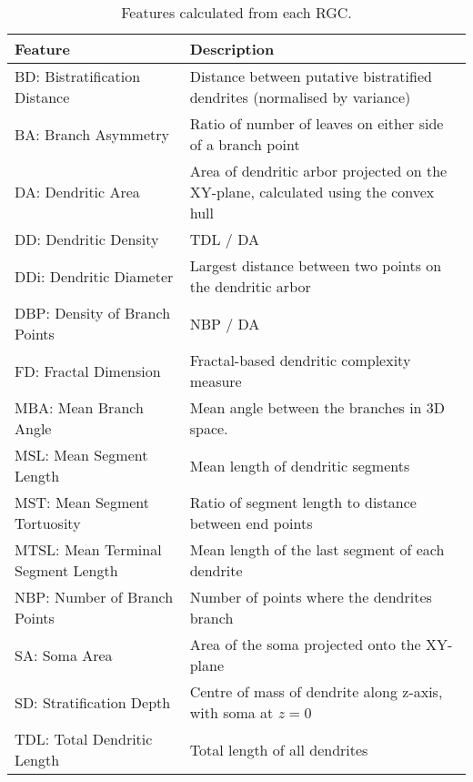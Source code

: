 \documentclass[11pt]{article}
\begin{document}
\begin{table}
  \centering
  {\renewcommand{\arraystretch}{1.3} \begin{tabular}{lp{8.5cm}}
      \toprule
      \textbf{Feature} & \textbf{Description} \\
      \midrule
      BD: Bistratification Distance & {\footnotesize Distance between putative bistratified dendrites (normalised by variance)}\\
      BA: Branch Asymmetry & {\footnotesize Ratio of number of leaves
        on either side of a branch point}\\
      DA: Dendritic Area & {\footnotesize Area of dendritic arbor projected on the XY-plane, calculated using the convex hull}\\
      DD: Dendritic Density & {\footnotesize TDL / DA}\\
      DDi: Dendritic Diameter & {\footnotesize  Largest distance between two points on the dendritic arbor}\\
      DBP: Density of Branch Points &  {\footnotesize  NBP / DA }\\
      FD: Fractal Dimension & {\footnotesize  Fractal-based dendritic complexity measure}\\
      MBA: Mean Branch Angle &  {\footnotesize  Mean angle between the branches in 3D space.}\\
      MSL: Mean Segment Length & {\footnotesize  Mean length of dendritic segments}\\
      MST: Mean Segment Tortuosity & {\footnotesize  Ratio of segment length to distance between end points}\\
      MTSL: Mean Terminal Segment Length & {\footnotesize  Mean length of the last segment of each dendrite}\\
      NBP: Number of Branch Points &  {\footnotesize  Number of points where the dendrites branch}\\
      SA: Soma Area & {\footnotesize  Area of the soma projected onto the XY-plane}\\
      SD: Stratification Depth & {\footnotesize Centre of mass of dendrite along z-axis, with soma at $z=0$}\\
      TDL: Total Dendritic Length & {\footnotesize Total length of all dendrites}\\
  \bottomrule
\end{tabular}
}
\caption{Features calculated from each RGC.}
\label{tab:featurelist}
\end{table}
\end{document}
